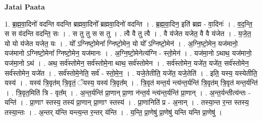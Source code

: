 \documentclass[17pt]{extarticle}
\begin{document}
\textbf{Jatai Paata} \newline

1. ब्र॒ह्म॒वा॒दिनो॑ वदन्ति वदन्ति ब्रह्मवा॒दिनो᳚ ब्रह्मवा॒दिनो॑ वदन्ति । . ब्र॒ह्म॒वा॒दिन॒ इति॑ ब्रह्म - वा॒दिनः॑ । . व॒द॒न्ति॒ स स व॑दन्ति वदन्ति॒ सः । . स तु तु स स तु । . त्वै वै तु त्वै । . वै य॑जेत यजेत॒ वै वै य॑जेत । . य॒जे॒त॒ यो यो य॑जेत यजेत॒ यः । . यो᳚ ऽग्निष्टो॒मेना᳚ ग्निष्टो॒मेन॒ यो यो᳚ ऽग्निष्टो॒मेन॑ । . अ॒ग्नि॒ष्टो॒मेन॒ यज॑मानो॒ यज॑मानो ऽग्निष्टो॒मेना᳚ ग्निष्टो॒मेन॒ यज॑मानः । . अ॒ग्नि॒ष्टो॒मेनेत्य॑ग्नि - स्तो॒मेन॑ । . यज॑मा॒नो ऽथाथ॒ यज॑मानो॒ यज॑मा॒नो ऽथ॑ । . अथ॒ सर्व॑स्तोमेन॒ सर्व॑स्तोमे॒ना थाथ॒ सर्व॑स्तोमेन । . सर्व॑स्तोमेन॒ यजे॑त॒ यजे॑त॒ सर्व॑स्तोमेन॒ सर्व॑स्तोमेन॒ यजे॑त । . सर्व॑स्तोमे॒नेति॒ सर्व॑ - स्तो॒मे॒न॒ । . यजे॒तेतीति॒ यजे॑त॒ यजे॒तेति॑ । . इति॒ यस्य॒ यस्येतीति॒ यस्य॑ । . यस्य॑ त्रि॒वृत॑म् त्रि॒वृतं॒ ॅयस्य॒ यस्य॑ त्रि॒वृत᳚म् । . त्रि॒वृत॑ मन्त॒र्य न्त्य॑न्त॒र्यन्ति॑ त्रि॒वृत॑म् त्रि॒वृत॑ मन्त॒र्यन्ति॑ । . त्रि॒वृत॒मिति॑ त्रि - वृत᳚म् । . अ॒न्त॒र्यन्ति॑ प्रा॒णान् प्रा॒णा न॑न्त॒र्य न्त्य॑न्त॒र्यन्ति॑ प्रा॒णान् । . अ॒न्त॒र्यन्तीत्य॑न्तः - यन्ति॑ । . प्रा॒णाꣳ स्तस्य॒ तस्य॑ प्रा॒णान् प्रा॒णाꣳ स्तस्य॑ । . प्रा॒णानिति॑ प्र - अ॒नान् । . तस्या॒न्त र॒न्त स्तस्य॒ तस्या॒न्तः । . अ॒न्तर् य॑न्ति यन्त्य॒न्त र॒न्तर् य॑न्ति । . य॒न्ति॒ प्रा॒णेषु॑ प्रा॒णेषु॑ यन्ति यन्ति प्रा॒णेषु॑ । \newline
\end{document}
